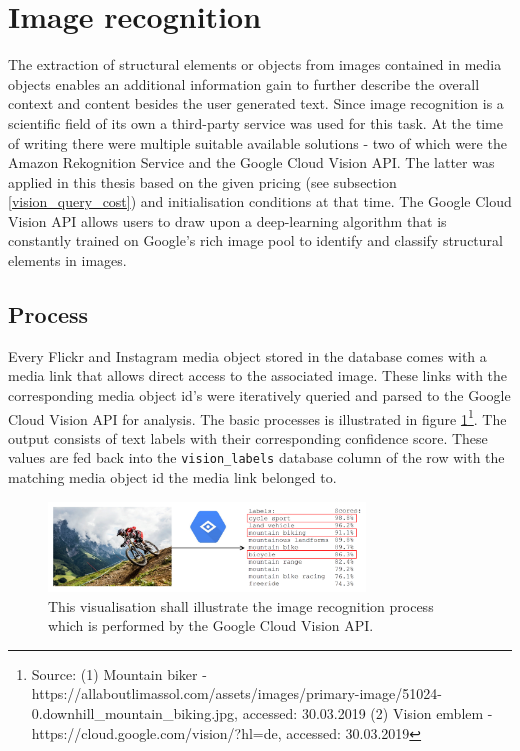\section{Image recognition} \label{image_recognition}
The extraction of structural elements or objects from images contained in media objects enables an additional information gain to further describe the overall context and content besides the user generated text. Since image recognition is a scientific field of its own a third-party service was used for this task. At the time of writing there were multiple suitable available solutions - two of which were the Amazon Rekognition Service and the Google Cloud Vision API. The latter was applied in this thesis based on the given pricing (see subsection \ref{vision_query_cost}) and initialisation conditions at that time. The Google Cloud Vision API allows users to draw upon a deep-learning algorithm that is constantly trained on Google's rich image pool to identify and classify structural elements in images.

\subsection{Process}
Every Flickr and Instagram media object stored in the database comes with a media link that allows direct access to the associated image. These links with the corresponding media object id's were iteratively queried and parsed to the Google Cloud Vision API for analysis. The basic processes is illustrated in figure \ref{fig:vision_illustration}\footnote{Source: (1) Mountain biker - https://allaboutlimassol.com/assets/images/primary-image/51024-0.downhill\_mountain\_biking.jpg, accessed: 30.03.2019 (2) Vision emblem - https://cloud.google.com/vision/?hl=de, accessed: 30.03.2019}. The output consists of text labels with their corresponding confidence score. These values are fed back into the \texttt{vision\_labels} database column of the row with the matching media object id the media link belonged to.

\begin{figure}[h!]
\centering
\includegraphics[width=0.75\textwidth]{img/vision_illustration}
\caption{This visualisation shall illustrate the image recognition process which is performed by the Google Cloud Vision API.}
\label{fig:vision_illustration}
\end{figure}

